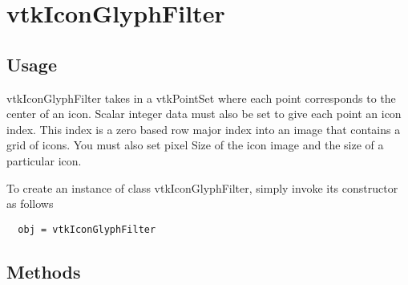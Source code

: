 \section{vtkIconGlyphFilter}

\subsection{Usage}

 vtkIconGlyphFilter takes in a vtkPointSet where each point corresponds to
 the center of an icon. Scalar integer data must also be set to give each
 point an icon index. This index is a zero based row major index into an
 image that contains a grid of icons. You must also set pixel Size of the 
 icon image and the size of a particular icon.

To create an instance of class vtkIconGlyphFilter, simply
invoke its constructor as follows
\begin{verbatim}
  obj = vtkIconGlyphFilter
\end{verbatim}
\subsection{Methods}

